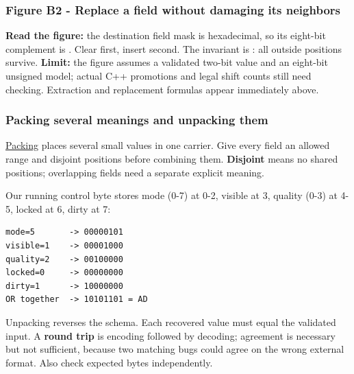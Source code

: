 \subsubsection{Figure B2 - Replace a field without damaging its neighbors}\label{01-foundations-i-ch001-figure-b2---replace-a-field-without-damaging-its-neighbors}

\hypertarget{01-foundations-i-ch001-figure-b2---replace-a-field-without-damaging-its-neighbors}{}


\textbf{Read the figure:} the destination field mask is  hexadecimal, so its eight-bit complement is . Clear first, insert second. The invariant is : all outside positions survive. \textbf{Limit:} the figure assumes a validated two-bit value and an eight-bit unsigned model; actual C++ promotions and legal shift counts still need checking. Extraction and replacement formulas appear immediately above.

\subsubsection{Packing several meanings and unpacking them}\label{01-foundations-i-ch001-packing-several-meanings-and-unpacking-them}

\hypertarget{01-foundations-i-ch001-packing-several-meanings-and-unpacking-them}{}

\hyperref[appendix-1f9963e1a5d1]{Packing} places several small values in one carrier. Give every field an allowed range and disjoint positions before combining them. \textbf{Disjoint} means no shared positions; overlapping fields need a separate explicit meaning.

Our running control byte stores mode (0-7) at 0-2, visible at 3, quality (0-3) at 4-5, locked at 6, dirty at 7:

\begin{verbatim}
mode=5       -> 00000101
visible=1    -> 00001000
quality=2    -> 00100000
locked=0     -> 00000000
dirty=1      -> 10000000
OR together  -> 10101101 = AD
\end{verbatim}

Unpacking reverses the schema. Each recovered value must equal the validated input. A \textbf{round trip} is encoding followed by decoding; agreement is necessary but not sufficient, because two matching bugs could agree on the wrong external format. Also check expected bytes independently.

